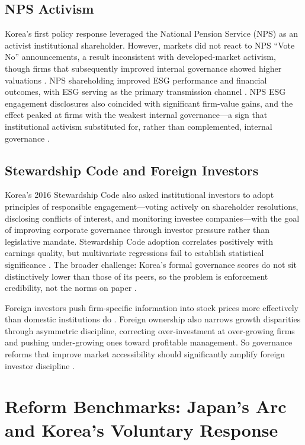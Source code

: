 \documentclass[12pt]{article}
\begin{document}
\subsection{NPS Activism}

Korea's first policy response leveraged the National Pension Service (NPS) as an activist institutional shareholder. However, markets did not react to NPS ``Vote No'' announcements, a result inconsistent with developed-market activism, though firms that subsequently improved internal governance showed higher valuations \citep{kim2014nps}. NPS shareholding improved ESG performance and financial outcomes, with ESG serving as the primary transmission channel \citep{kim2022nps_esg}. NPS ESG engagement disclosures also coincided with significant firm-value gains, and the effect peaked at firms with the weakest internal governance---a sign that institutional activism substituted for, rather than complemented, internal governance \citep{lee2026esg}.

\subsection{Stewardship Code and Foreign Investors}

Korea's 2016 Stewardship Code also asked institutional investors to adopt principles of responsible engagement---voting actively on shareholder resolutions, disclosing conflicts of interest, and monitoring investee companies---with the goal of improving corporate governance through investor pressure rather than legislative mandate. Stewardship Code adoption correlates positively with earnings quality, but multivariate regressions fail to establish statistical significance \citep{park2021stewardship}. The broader challenge: Korea's formal governance scores do not sit distinctively lower than those of its peers, so the problem is enforcement credibility, not the norms on paper \citep{kim2025causes}.

Foreign investors push firm-specific information into stock prices more effectively than domestic institutions do \citep{kim2015foreign}. Foreign ownership also narrows growth disparities through asymmetric discipline, correcting over-investment at over-growing firms and pushing under-growing ones toward profitable management. So governance reforms that improve market accessibility should significantly amplify foreign investor discipline \citep{joo2026foreign}.

\section{Reform Benchmarks: Japan's Arc and Korea's Voluntary Response}
\label{sec:reform}
\end{document}
